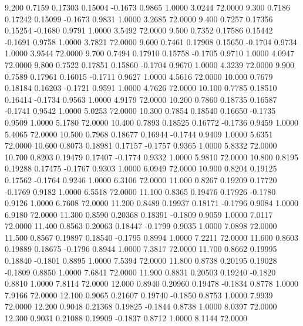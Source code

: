    9.200   0.7159   0.17303   0.15004  -0.1673   0.9865   1.0000   3.0244  72.0000
   9.300   0.7186   0.17242   0.15099  -0.1673   0.9831   1.0000   3.2685  72.0000
   9.400   0.7257   0.17356   0.15254  -0.1680   0.9791   1.0000   3.5492  72.0000
   9.500   0.7352   0.17586   0.15442  -0.1691   0.9758   1.0000   3.7821  72.0000
   9.600   0.7461   0.17908   0.15650  -0.1704   0.9734   1.0000   3.9544  72.0000
   9.700   0.7494   0.17910   0.15758  -0.1705   0.9710   1.0000   4.0947  72.0000
   9.800   0.7522   0.17851   0.15860  -0.1704   0.9670   1.0000   4.3239  72.0000
   9.900   0.7589   0.17961   0.16015  -0.1711   0.9627   1.0000   4.5616  72.0000
  10.000   0.7679   0.18184   0.16203  -0.1721   0.9591   1.0000   4.7626  72.0000
  10.100   0.7785   0.18510   0.16414  -0.1734   0.9563   1.0000   4.9179  72.0000
  10.200   0.7860   0.18735   0.16587  -0.1741   0.9542   1.0000   5.0253  72.0000
  10.300   0.7854   0.18540   0.16650  -0.1735   0.9509   1.0000   5.1780  72.0000
  10.400   0.7893   0.18525   0.16772  -0.1736   0.9459   1.0000   5.4065  72.0000
  10.500   0.7968   0.18677   0.16944  -0.1744   0.9409   1.0000   5.6351  72.0000
  10.600   0.8073   0.18981   0.17157  -0.1757   0.9365   1.0000   5.8332  72.0000
  10.700   0.8203   0.19479   0.17407  -0.1774   0.9332   1.0000   5.9810  72.0000
  10.800   0.8195   0.19288   0.17475  -0.1767   0.9303   1.0000   6.0949  72.0000
  10.900   0.8204   0.19125   0.17562  -0.1764   0.9246   1.0000   6.3106  72.0000
  11.000   0.8267   0.19209   0.17720  -0.1769   0.9182   1.0000   6.5518  72.0000
  11.100   0.8365   0.19476   0.17926  -0.1780   0.9126   1.0000   6.7608  72.0000
  11.200   0.8489   0.19937   0.18171  -0.1796   0.9084   1.0000   6.9180  72.0000
  11.300   0.8590   0.20368   0.18391  -0.1809   0.9059   1.0000   7.0117  72.0000
  11.400   0.8563   0.20063   0.18447  -0.1799   0.9035   1.0000   7.0898  72.0000
  11.500   0.8567   0.19897   0.18540  -0.1795   0.8994   1.0000   7.2211  72.0000
  11.600   0.8603   0.19889   0.18675  -0.1796   0.8944   1.0000   7.3817  72.0000
  11.700   0.8662   0.19995   0.18840  -0.1801   0.8895   1.0000   7.5394  72.0000
  11.800   0.8738   0.20195   0.19028  -0.1809   0.8850   1.0000   7.6841  72.0000
  11.900   0.8831   0.20503   0.19240  -0.1820   0.8810   1.0000   7.8114  72.0000
  12.000   0.8940   0.20960   0.19478  -0.1834   0.8778   1.0000   7.9166  72.0000
  12.100   0.9065   0.21607   0.19740  -0.1850   0.8753   1.0000   7.9939  72.0000
  12.200   0.9048   0.21368   0.19825  -0.1844   0.8738   1.0000   8.0397  72.0000
  12.300   0.9031   0.21088   0.19909  -0.1837   0.8712   1.0000   8.1144  72.0000
